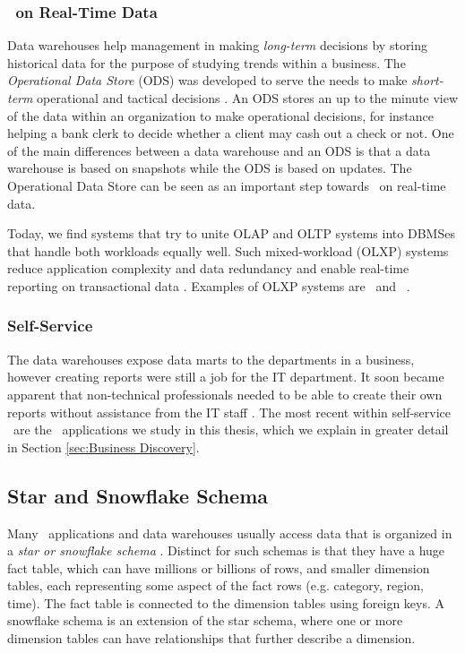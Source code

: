 \subsubsection{\bi~on Real-Time Data}
Data warehouses help management in making \textit{long-term} decisions by storing historical data for the purpose of studying trends within a business. The \textit{Operational Data Store} (ODS) was developed to serve the needs to make \textit{short-term} operational and tactical decisions \cite{Pavlic2002-nm}. An ODS stores an up to the minute view of the data within an organization to make operational decisions, for instance helping a bank clerk to decide whether a client may cash out a check or not. One of the main differences between a data warehouse and an ODS is that a data warehouse is based on snapshots while the ODS is based on updates. The Operational Data Store can be seen as an important step towards \bi~on real-time data.

Today, we find systems that try to unite OLAP and OLTP systems into DBMSes that handle both workloads equally well. Such mixed-workload (OLXP) systems reduce application complexity and data redundancy and enable real-time reporting on transactional data \cite{Plattner2014-fr}. Examples of OLXP systems are \hyper~and \hyrise~\cite{Kemper2011-ap, Schwalb2014-hn}.

\subsubsection{Self-Service \bi}
The data warehouses expose data marts to the departments in a business, however creating reports were still a job for the IT department. It soon became apparent that non-technical professionals needed to be able to create their own reports without assistance from the IT staff \cite{noauthor_undated-fi}. The most recent within self-service \bi~are the \bd~applications we study in this thesis, which we explain in greater detail in Section \ref{sec:Business Discovery}.

\subsection{Star and Snowflake Schema}
\label{sub:Star and Snowflake Schema}
Many \bi~applications and data warehouses usually access data that is organized in a \textit{star or snowflake schema} \cite{Barber2012-xt}. Distinct for such schemas is that they have a huge fact table, which can have millions or billions of rows, and smaller dimension tables, each representing some aspect of the fact rows (e.g. category, region, time). The fact table is connected to the dimension tables using foreign keys. A snowflake schema is an extension of the star schema, where one or more dimension tables can have relationships that further describe a dimension.

